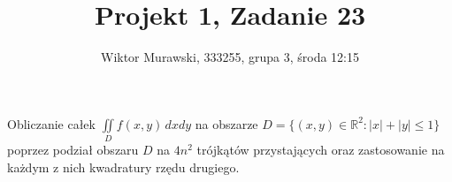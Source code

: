 \documentclass[9pt]{beamer}
\title{Projekt 1, Zadanie 23}
\author{Wiktor Murawski, 333255, grupa 3, środa 12:15}
\date{}
\begin{document}
\begin{frame}

    \begin{spacing}{2}
    \begin{center}
        \inserttitle\par
        \insertauthor
    \end{center}
    \vspace{2em}
    Obliczanie całek $ \iint\limits_D f(x,y) \, dxdy $ na obszarze
    $  D = \{(x,y) \in \mathbb{R}^2 : |x| + |y| \leq 1\} $
    poprzez podział obszaru $ D $ na $ 4n^2 $ trójkątów przystających oraz
    zastosowanie na każdym z nich kwadratury rzędu drugiego.
    \end{spacing}
\end{frame}
\end{document}
